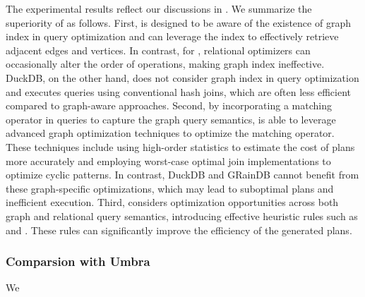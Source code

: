 The experimental results reflect our discussions in . We summarize the superiority  of \name as follows.
First, \name is designed to be aware of the existence of graph index in query optimization and can leverage the index to effectively retrieve adjacent edges and vertices. In contrast, for , relational optimizers can occasionally alter the order of \EVjoin operations, making graph index ineffective. DuckDB, on the other hand, does not consider graph index in query optimization and executes queries using conventional hash joins, which are often less efficient compared to graph-aware approaches.
Second, by incorporating a matching operator in \spjm queries to capture the graph query semantics, \name is able to leverage advanced graph optimization techniques to optimize the matching operator. These techniques include using high-order statistics to estimate the cost of plans more accurately and employing worst-case optimal join implementations to optimize cyclic patterns. In contrast, DuckDB and GRainDB cannot benefit from these graph-specific optimizations, which may lead to suboptimal plans and inefficient execution.
Third, \name considers optimization opportunities across both graph and relational query semantics, introducing effective heuristic rules such as \filterrule and \joinfuserule. These rules can significantly improve the efficiency of the generated plans.


\subsubsection{Comparsion with Umbra}
We  

